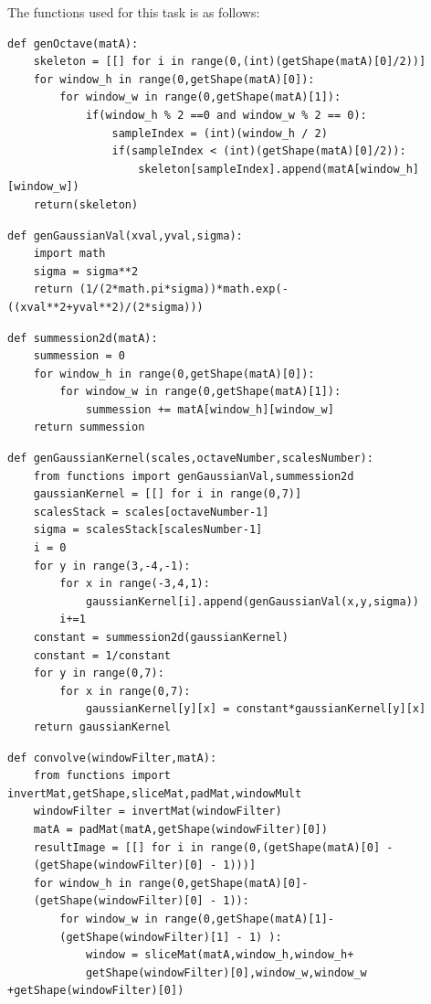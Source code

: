 \documentclass[12pt]{article}
\newenvironment{QandA}
{
	\begin{enumerate}[label=\normalfont\arabic*.,leftmargin=2em,rightmargin=2em]\normalfont
	}
	{
	\end{enumerate}
}
\newenvironment{codelalala}{}{}
\newenvironment{answered}{\setlength{\parindent}{1em}\par\normalfont}{}
\begin{document}
\begin{QandA}
\begin{answered}
The functions used for this task is as follows:
\begin{codelalala}
\begin{verbatim}
def genOctave(matA):
    skeleton = [[] for i in range(0,(int)(getShape(matA)[0]/2))]
    for window_h in range(0,getShape(matA)[0]):
        for window_w in range(0,getShape(matA)[1]):
            if(window_h % 2 ==0 and window_w % 2 == 0):
                sampleIndex = (int)(window_h / 2)
                if(sampleIndex < (int)(getShape(matA)[0]/2)):
                    skeleton[sampleIndex].append(matA[window_h][window_w])
    return(skeleton)
\end{verbatim}
\begin{verbatim}
def genGaussianVal(xval,yval,sigma):
    import math
    sigma = sigma**2
    return (1/(2*math.pi*sigma))*math.exp(-((xval**2+yval**2)/(2*sigma)))
\end{verbatim}
\begin{verbatim}
def summession2d(matA):
    summession = 0
    for window_h in range(0,getShape(matA)[0]):
        for window_w in range(0,getShape(matA)[1]):
            summession += matA[window_h][window_w]
    return summession
\end{verbatim}
\begin{verbatim}
def genGaussianKernel(scales,octaveNumber,scalesNumber):
    from functions import genGaussianVal,summession2d
    gaussianKernel = [[] for i in range(0,7)]
    scalesStack = scales[octaveNumber-1]
    sigma = scalesStack[scalesNumber-1]
    i = 0
    for y in range(3,-4,-1):
        for x in range(-3,4,1):
            gaussianKernel[i].append(genGaussianVal(x,y,sigma))
        i+=1
    constant = summession2d(gaussianKernel)
    constant = 1/constant
    for y in range(0,7):
        for x in range(0,7):
            gaussianKernel[y][x] = constant*gaussianKernel[y][x] 
    return gaussianKernel
\end{verbatim}
\begin{verbatim}
def convolve(windowFilter,matA):
    from functions import invertMat,getShape,sliceMat,padMat,windowMult
    windowFilter = invertMat(windowFilter)
    matA = padMat(matA,getShape(windowFilter)[0])
    resultImage = [[] for i in range(0,(getShape(matA)[0] - 
    (getShape(windowFilter)[0] - 1)))]
    for window_h in range(0,getShape(matA)[0]-
    (getShape(windowFilter)[0] - 1)):
        for window_w in range(0,getShape(matA)[1]-
        (getShape(windowFilter)[1] - 1) ):
            window = sliceMat(matA,window_h,window_h+
            getShape(windowFilter)[0],window_w,window_w +getShape(windowFilter)[0])

\end{verbatim}
\end{codelalala}
\end{answered}
\end{QandA}
\end{document}
